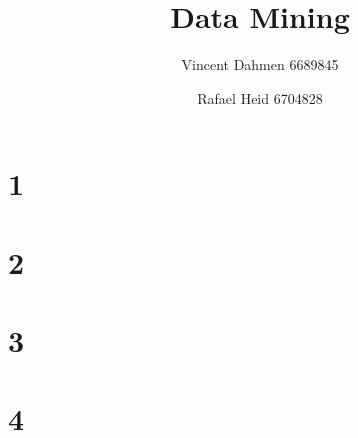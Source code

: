\documentclass[12pt,a4paper]{article}
\title{Data Mining}
\author{Vincent Dahmen 6689845 \and Rafael Heid 6704828}
\begin{document}
\maketitle{}


\section*{1}

\section*{2}

\section*{3}

\section*{4}

\end{document}
